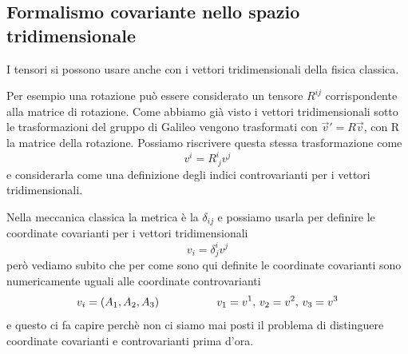 \documentclass[12pt,a4paper,titlepage, twoside, openright]{book}
\numberwithin{equation}{chapter}
\begin{document}
\subsection{Formalismo covariante nello spazio tridimensionale}
I tensori si possono usare anche con i vettori tridimensionali della fisica classica.

Per esempio una rotazione può essere considerato un tensore $R^{ij}$ corrispondente alla matrice di rotazione.
Come abbiamo già visto i vettori tridimensionali sotto le trasformazioni del gruppo di Galileo vengono trasformati con $\vec{v}'=R\vec{v}$, con R la matrice della rotazione. Possiamo riscrivere questa stessa trasformazione come
\[
v^{i}=R^i_{\> j} v^j
\]
e considerarla come una definizione degli indici controvarianti per i vettori tridimensionali.

Nella meccanica classica la metrica è la $\delta_{ij}$ e possiamo usarla per definire le coordinate covarianti per i vettori tridimensionali
\[
v_i=\delta^i_jv^j
\]
però vediamo subito che per come sono qui definite le coordinate covarianti sono numericamente uguali alle coordinate controvarianti
\[
v_i=(A_1,A_2,A_3) \hspace{0.15\linewidth} v_1=v^1, \, v_2=v^2, \, v_3=v^3
\]
e questo ci fa capire perchè non ci siamo mai posti il problema di distinguere coordinate covarianti e controvarianti prima d'ora.\\$ $\\
\end{document}
